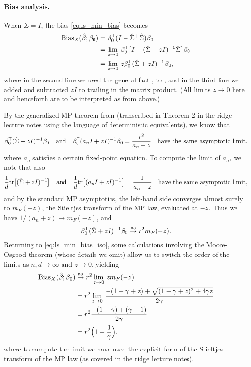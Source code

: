 \documentclass{article}
\begin{document}
\paragraph{Bias analysis.}

When $\Sigma = I$, the bias \eqref{eq:ls_min_bias} becomes 
\begin{align}
\nonumber
\mathrm{Bias}_X(\hat{\beta}; \beta_0) 
&= \beta_0^{\mathsf{T}} (I - \hat\Sigma^+ \hat\Sigma) \beta_0 \\ 
\nonumber
&= \lim_{z \to 0} \, \beta_0^{\mathsf{T}} \big[ I - (\hat\Sigma + zI)^{-1} \hat\Sigma \big]
  \beta_0 \\   
\label{eq:ls_min_bias_iso}
&= \lim_{z \to 0} \, z \beta_0^{\mathsf{T}} (\hat\Sigma + zI)^{-1} \beta_0, 
\end{align}
where in the second line we used the general fact , to , and 
in the third line we added and subtracted $zI$ to trailing \smash{$\hSigma$} in
the matrix product. (All limits $z \to 0$ here and henceforth are to be
interpreted as from above.)

By the generalized MP theorem from \citet{rubio2011spectral} (transcribed in
Theorem 2 in the ridge lecture notes using the language of deterministic
equivalents), we know that  
\[
\beta_0^{\mathsf{T}} (\hat\Sigma + zI)^{-1} \beta_0 \quad \text{and} \quad 
\beta_0^{\mathsf{T}} (a_n I + zI)^{-1} \beta_0 = \frac{r^2}{a_n + z} \quad
\text{have the same asymptotic limit},
\]
where $a_n$ satisfies a certain fixed-point equation. To compute the limit of
$a_n$, we note that also
\[
\frac{1}{d} \mathrm{tr} \big[ (\hat\Sigma + zI)^{-1} \big] \quad \text{and} \quad 
\frac{1}{d} \mathrm{tr} \big[ (a_n I + zI)^{-1} \big] = \frac{1}{a_n + z}
\quad \text{have the same asymptotic limit},  
\]
and by the standard MP asymptotics, the left-hand side converges almost surely
to $m_F(-z)$, the Stieltjes transform of the MP law, evaluated at $-z$. Thus we
have $1/(a_n + z) \to m_F(-z)$, and   
\[
\beta_0^{\mathsf{T}} (\hat\Sigma + zI)^{-1} \beta_0 \overset{\mathrm{as}}{\to} r^2 m_F(-z).
\]
Returning to \eqref{eq:ls_min_bias_iso}, some calculations involving the
Moore-Osgood theorem (whose details we omit) allow us to switch the order of the
limits as $n,d \to \infty$ and $z \to 0$, yielding
\begin{align}
\nonumber
\mathrm{Bias}_X(\hat{\beta}; \beta_0) &\overset{\mathrm{as}}{\to} r^2 \lim_{z \to 0} \, z m_F(-z) \\
\nonumber
&= r^2 \lim_{z \to 0} \, \frac{-(1 - \gamma + z) + \sqrt{(1 - \gamma + z)^2 +
  4 \gamma z}}{2 \gamma} \\
\nonumber
&= r^2 \frac{-(1-\gamma) + (\gamma-1)}{2 \gamma} \\
\label{eq:ls_min_bias_iso_limit}
&= r^2 \Big( 1- \frac{1}{\gamma} \Big),
\end{align}
where to compute the limit we have used the explicit form of the Stieltjes
transform of the MP law (as covered in the ridge lecture notes).
\end{document}
